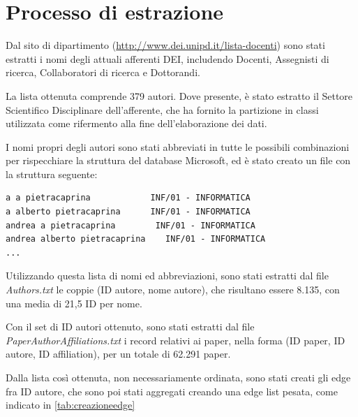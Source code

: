 \documentclass[12pt,a4paper,twoside]{report}
\begin{document}
\section{Processo di estrazione} \label{sec:processo}
Dal sito di dipartimento (\url{http://www.dei.unipd.it/lista-docenti}) sono stati estratti i nomi
degli attuali afferenti DEI, includendo Docenti, Assegnisti di ricerca, Collaboratori di ricerca e
Dottorandi.

La lista ottenuta comprende 379 autori.
Dove presente, è stato estratto il Settore Scientifico Disciplinare dell'afferente, che ha fornito
la partizione in classi utilizzata come rifermento alla fine dell'elaborazione dei dati.

I nomi propri degli autori sono stati abbreviati in tutte le possibili combinazioni per rispecchiare
la struttura del database Microsoft, ed è stato creato un file con la struttura seguente:

\begin{center}
\begin{minipage}{0.90\textwidth}
\begin{verbatim}
a a pietracaprina            INF/01 - INFORMATICA
a alberto pietracaprina	     INF/01 - INFORMATICA
andrea a pietracaprina	      INF/01 - INFORMATICA
andrea alberto pietracaprina	INF/01 - INFORMATICA
...

\end{verbatim}
\end{minipage}
\end{center}

Utilizzando questa lista di nomi ed abbreviazioni, sono stati estratti dal file \textit{Authors.txt}
le coppie (ID autore, nome autore), che risultano essere 8.135, con una media di 21,5 ID per nome.

Con il set di ID autori ottenuto, sono stati estratti dal file \textit{PaperAuthorAffiliations.txt}
i record relativi ai paper, nella forma (ID paper, ID autore, ID affiliation), per un totale di
62.291 paper.

Dalla lista così ottenuta, non necessariamente ordinata, sono stati creati gli edge fra ID autore,
che sono poi stati aggregati creando una edge list pesata, come indicato in \ref{tab:creazioneedge}
\end{document}
